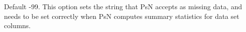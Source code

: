 Default -99. This option sets the string that PsN accepts as missing data,
and needs to be set correctly when PsN computes summary statistics for data set columns.
\nextopt
